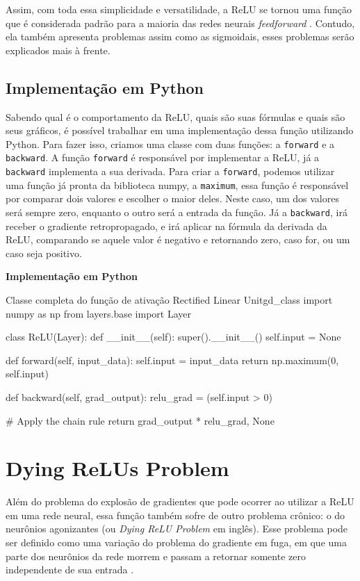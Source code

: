 Assim, com toda essa simplicidade e versatilidade, a ReLU se tornou uma função que é considerada padrão para a maioria das redes neurais \textit{feedforward} \parencite{DeepLearningBook}. Contudo, ela também apresenta problemas assim como as sigmoidais, esses problemas serão explicados mais à frente.

\subsection{Implementação em Python}

Sabendo qual é o comportamento da ReLU, quais são suas fórmulas e quais são seus gráficos, é possível trabalhar em uma implementação dessa função utilizando Python. Para fazer isso, criamos uma classe com duas funções: a \texttt{forward} e a \texttt{backward}. A função \texttt{forward} é responsável por implementar a ReLU, já a \texttt{backward} implementa a sua derivada. Para criar a \texttt{forward}, podemos utilizar uma função já pronta da biblioteca numpy, a \texttt{maximum}, essa função é responsável por comparar dois valores e escolher o maior deles. Neste caso, um dos valores será sempre zero, enquanto o outro será a entrada da função. Já a \texttt{backward}, irá receber o gradiente retropropagado, e irá aplicar na fórmula da derivada da ReLU, comparando se aquele valor é negativo e retornando zero, caso for, ou um caso seja positivo.

\textbf{Implementação em Python}

\begin{codelisting}{Classe completa do função de ativação Rectified Linear Unit}{gd_class}
import numpy as np
from layers.base import Layer

class ReLU(Layer):
    def __init__(self):
        super().__init__()
        self.input = None

    def forward(self, input_data):
        self.input = input_data
        return np.maximum(0, self.input)

    def backward(self, grad_output):
        relu_grad = (self.input > 0)

        # Apply the chain rule
        return grad_output * relu_grad, None
\end{codelisting}

\section{Dying ReLUs Problem}

Além do problema do explosão de gradientes que pode ocorrer ao utilizar a ReLU em uma rede neural, essa função também sofre de outro problema crônico: o do neurônios agonizantes (ou \textit{Dying ReLU Problem} em inglês). Esse problema pode ser definido como uma variação do problema do gradiente em fuga, em que uma parte dos neurônios da rede morrem e passam a retornar somente zero independente de sua entrada \parencite{dyingReLU}.

